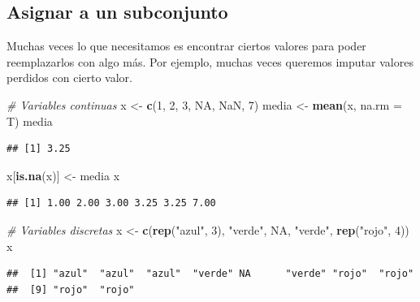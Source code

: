 \documentclass[]{article}
\newenvironment{Shaded}{\begin{snugshade}}{\end{snugshade}}
\newcommand{\KeywordTok}[1]{\textcolor[rgb]{0.13,0.29,0.53}{\textbf{{#1}}}}
\newcommand{\DataTypeTok}[1]{\textcolor[rgb]{0.13,0.29,0.53}{{#1}}}
\newcommand{\DecValTok}[1]{\textcolor[rgb]{0.00,0.00,0.81}{{#1}}}
\newcommand{\StringTok}[1]{\textcolor[rgb]{0.31,0.60,0.02}{{#1}}}
\newcommand{\CommentTok}[1]{\textcolor[rgb]{0.56,0.35,0.01}{\textit{{#1}}}}
\newcommand{\OtherTok}[1]{\textcolor[rgb]{0.56,0.35,0.01}{{#1}}}
\newcommand{\NormalTok}[1]{{#1}}
\begin{document}
\subsection{Asignar a un subconjunto}\label{asignar-a-un-subconjunto}

Muchas veces lo que necesitamos es encontrar ciertos valores para poder
reemplazarlos con algo más. Por ejemplo, muchas veces queremos imputar
valores perdidos con cierto valor.

\begin{Shaded}
\begin{Highlighting}[]
\CommentTok{# Variables continuas}
\NormalTok{x <-}\StringTok{ }\KeywordTok{c}\NormalTok{(}\DecValTok{1}\NormalTok{, }\DecValTok{2}\NormalTok{, }\DecValTok{3}\NormalTok{, }\OtherTok{NA}\NormalTok{, }\OtherTok{NaN}\NormalTok{, }\DecValTok{7}\NormalTok{)}
\NormalTok{media <-}\StringTok{ }\KeywordTok{mean}\NormalTok{(x, }\DataTypeTok{na.rm =} \NormalTok{T)}
\NormalTok{media}
\end{Highlighting}
\end{Shaded}

\begin{verbatim}
## [1] 3.25
\end{verbatim}

\begin{Shaded}
\begin{Highlighting}[]
\NormalTok{x[}\KeywordTok{is.na}\NormalTok{(x)] <-}\StringTok{ }\NormalTok{media}
\NormalTok{x}
\end{Highlighting}
\end{Shaded}

\begin{verbatim}
## [1] 1.00 2.00 3.00 3.25 3.25 7.00
\end{verbatim}

\begin{Shaded}
\begin{Highlighting}[]
\CommentTok{# Variables discretas}
\NormalTok{x <-}\StringTok{ }\KeywordTok{c}\NormalTok{(}\KeywordTok{rep}\NormalTok{(}\StringTok{"azul"}\NormalTok{, }\DecValTok{3}\NormalTok{), }\StringTok{"verde"}\NormalTok{, }\OtherTok{NA}\NormalTok{, }\StringTok{"verde"}\NormalTok{, }\KeywordTok{rep}\NormalTok{(}\StringTok{"rojo"}\NormalTok{, }\DecValTok{4}\NormalTok{))}
\NormalTok{x}
\end{Highlighting}
\end{Shaded}

\begin{verbatim}
##  [1] "azul"  "azul"  "azul"  "verde" NA      "verde" "rojo"  "rojo" 
##  [9] "rojo"  "rojo"
\end{verbatim}
\end{document}
